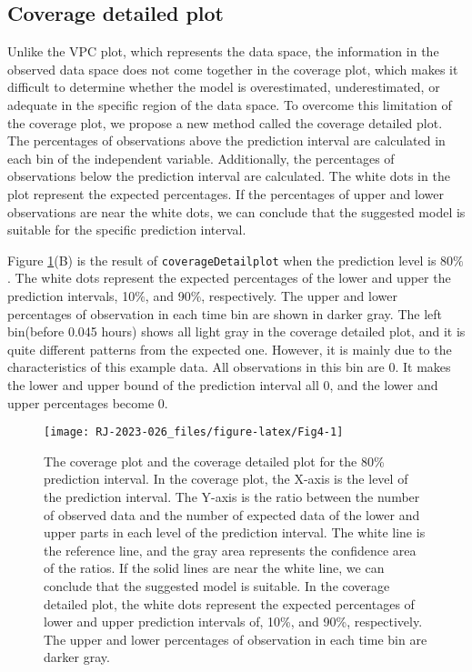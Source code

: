 \hypertarget{coverage-detailed-plot}{%
\subsection{Coverage detailed plot}\label{coverage-detailed-plot}}

Unlike the VPC plot, which represents the data space, the information in the observed data space does not come together in the coverage plot, which makes it difficult to determine whether the model is overestimated, underestimated, or adequate in the specific region of the data space. To overcome this limitation of the coverage plot, we propose a new method called the coverage detailed plot.
The percentages of observations above the prediction interval are calculated in each bin of the independent variable. Additionally, the percentages of observations below the prediction interval are calculated. The white dots in the plot represent the expected percentages. If the percentages of upper and lower observations are near the white dots, we can conclude that the suggested model is suitable for the specific prediction interval.

Figure \ref{fig:Fig4}(B) is the result of \texttt{coverageDetailplot} when the prediction level is 80\(\%\). The white dots represent the expected percentages of the lower and upper the prediction intervals, 10\(\%\), and 90\(\%\), respectively. The upper and lower percentages of observation in each time bin are shown in darker gray. The left bin(before 0.045 hours) shows all light gray in the coverage detailed plot, and it is quite different patterns from the expected one. However, it is mainly due to the characteristics of this example data. All observations in this bin are 0. It makes the lower and upper bound of the prediction interval all 0, and the lower and upper percentages become 0.

\begin{figure}
\texttt{[image: RJ-2023-026\_files/figure-latex/Fig4-1]} \caption{The coverage plot and the coverage detailed plot for the 80\% prediction interval. In the coverage plot, the X-axis is the level of the prediction interval. The Y-axis is the ratio between the number of observed data and the number of expected data of the lower and upper parts in each level of the prediction interval. The white line is the reference line, and the gray area represents the confidence area of the ratios. If the solid lines are near the white line, we can conclude that the suggested model is suitable. In the coverage detailed plot, the white dots represent the expected percentages of lower and upper prediction intervals of, 10\%, and 90\%, respectively. The upper and lower percentages of observation in each time bin are darker gray.}\label{fig:Fig4}
\end{figure}

